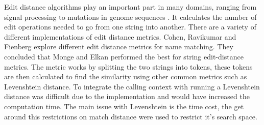Edit distance algorithms play an important part in many domains, ranging from signal processing to mutations in genome sequences \cite{navarro2001guided}. It calculates the number of edit operations needed to go from one string into another. There are a variety of different implementations of edit distance metrics. Cohen, Ravikumar and Fienberg \cite{cohen2003comparison} explore different edit distance metrics for name matching. They concluded that Monge and Elkan performed the best for string edit-distance metrics. The metric works by splitting the two strings into tokens, these tokens are then calculated to find the similarity using other common metrics such as Levenshtein distance. To integrate the calling context with running a Levenshtein distance was difficult due to the implementation and would have increased the computation time. The main issue with Levenshtein is the time cost, the get around this restrictions on match distance were used to restrict it's search space.